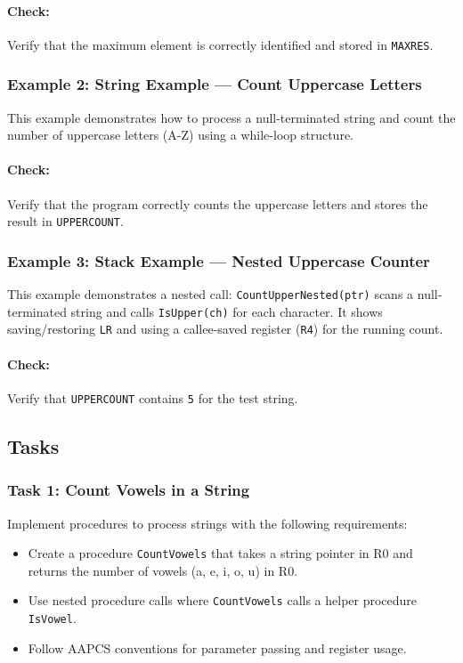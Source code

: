 \paragraph{Check:} Verify that the maximum element is correctly identified and stored in \texttt{MAXRES}.
\newpage

\subsubsection{Example 2: String Example — Count Uppercase Letters}
This example demonstrates how to process a null-terminated string and count the number of uppercase letters (A-Z) using a while-loop structure.

\paragraph{Check:} Verify that the program correctly counts the uppercase letters and stores the result in \texttt{UPPERCOUNT}.

\newpage
\subsubsection{Example 3: Stack Example — Nested Uppercase Counter}
This example demonstrates a nested call: \texttt{CountUpperNested(ptr)} scans a null-terminated string and calls \texttt{IsUpper(ch)} for each character. It shows saving/restoring \texttt{LR} and using a callee-saved register (\texttt{R4}) for the running count.

\paragraph{Check:} Verify that \texttt{UPPERCOUNT} contains \texttt{5} for the test string.

\newpage
\subsection{Tasks}

\subsubsection{Task 1: Count Vowels in a String}
Implement procedures to process strings with the following requirements:
\begin{itemize}[nosep]
    \item Create a procedure \texttt{CountVowels} that takes a string pointer in R0 and returns the number of vowels (a, e, i, o, u) in R0.
    \item Use nested procedure calls where \texttt{CountVowels} calls a helper procedure \texttt{IsVowel}.
    \item Follow AAPCS conventions for parameter passing and register usage.
\end{itemize}

